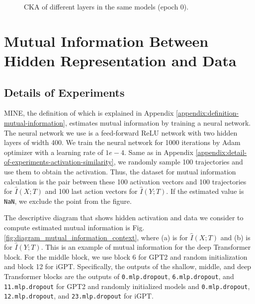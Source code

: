 \documentclass{article}
\begin{document}
\begin{figure}[H]
\begin{minipage}[b]{0.32\linewidth}
    \end{minipage}
    \caption{CKA of different layers in the same models (epoch 0).}
    \label{fig:cka_0_gpt2_igpt_dt}
\end{figure}

\section{Mutual Information Between Hidden Representation and Data}
\label{appendix:mutual-information-between-hidden-representation-and-input-and-label}

\subsection{Details of Experiments}
\label{appendix:detail-of-experiments-mutual-information}

MINE, the definition of which is explained in Appendix \ref{appendix:definition-mutual-information}, estimates mutual information by training a neural network. The neural network we use is a feed-forward ReLU network with two hidden layers of width 400. We train the neural network for 1000 iterations by Adam optimizer with a learning rate of $1e-4$. Same as in Appendix \ref{appendix:detail-of-experiments-activation-similarity}, we randomly sample 100 trajectories and use them to obtain the activation. Thus, the dataset for mutual information calculation is the pair between these 100 activation vectors and 100 trajectories for $\hat{I}(X; T)$ and 100 last action vectors for $\hat{I}(Y; T)$. If the estimated value is \lstinline{NaN}, we exclude the point from the figure.

The descriptive diagram that shows hidden activation and data we consider to compute estimated mutual information is Fig. \ref{fig:diagram_mutual_information_context}, where (a) is for $\hat{I}(X; T)$ and (b) is for $\hat{I}(Y; T)$. This is an example of mutual information for the deep Transformer block. For the middle block, we use block 6 for GPT2 and random initialization and block 12 for iGPT. Specifically, the outputs of the shallow, middle, and deep Transformer blocks are the outputs of \lstinline{0.mlp.dropout}, \lstinline{6.mlp.dropout}, and \lstinline{11.mlp.dropout} for GPT2 and randomly initialized models and \lstinline{0.mlp.dropout}, \lstinline{12.mlp.dropout}, and \lstinline{23.mlp.dropout} for iGPT.
\end{document}

